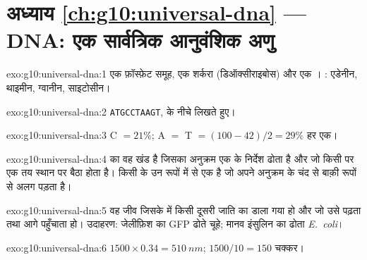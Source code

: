 \section*{अध्याय \ref{ch:g10:universal-dna} --- DNA: एक सार्वत्रिक आनुवंशिक अणु}

\begin{solution}{exo:g10:universal-dna:1}
एक फ़ॉस्फ़ेट समूह, एक शर्करा (डिऑक्सीराइबोस) और एक । :
एडेनीन, थाइमीन, ग्वानीन, साइटोसीन।
\end{solution}

\begin{solution}{exo:g10:universal-dna:2}
\texttt{ATGCCTAAGT},  के नीचे  लिखते हुए।
\end{solution}

\begin{solution}{exo:g10:universal-dna:3}
C $= 21\%$; A $=$ T $= (100 - 42)/2 = 29\%$ हर एक।
\end{solution}

\begin{solution}{exo:g10:universal-dna:4}
  का वह खंड है जिसका अनुक्रम एक  के निर्देश ढोता है और जो
किसी  पर एक तय स्थान पर बैठा होता है।  किसी  के उन
रूपों में से एक है जो अपने अनुक्रम के चंद  से बाक़ी रूपों से अलग
पड़ता है।
\end{solution}

\begin{solution}{exo:g10:universal-dna:5}
वह जीव जिसके  में किसी दूसरी जाति का  डाला गया हो और जो उसे पढ़ता
तथा आगे पहुँचाता हो। उदाहरण: जेलीफ़िश का GFP  ढोते चूहे; मानव इंसुलिन
का  ढोता \emph{E.~coli}।
\end{solution}

\begin{solution}{exo:g10:universal-dna:6}
$1500 \times 0.34 = \qty{510}{nm}$; $1500/10 = 150$ चक्कर।
\end{solution}

